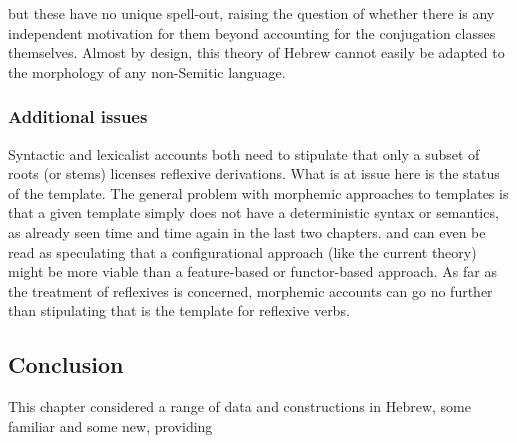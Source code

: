 \begin{exe}
\begin{xlist}
\begin{xlist}
\begin{exe}
\begin{xlist}
\begin{xlist}
\begin{exe}
\begin{xlist}
\begin{xlist}
\begin{exe}
\begin{exe}
\begin{xlist}
\begin{exe}
\begin{exe}
\begin{xlist}
\begin{exe}
\begin{exe}
\begin{exe}
\begin{exe}
\begin{exe}
\begin{xlist}
\begin{exe}
\begin{xlist}
\begin{exe}
\begin{exe}
\begin{xlist}
\begin{exe}
\begin{xlist}
\begin{exe}
\begin{xlist}
\begin{exe}
\begin{exe}
\begin{exe}
\begin{xlist}
\begin{exe}
\begin{exe}
\begin{exe}
\begin{xlist}
\begin{exe}
\begin{xlist}
\begin{exe}
\begin{xlist}
\begin{exe}
\begin{xlist}
\begin{exe}
\begin{exe}
\begin{exe}
\begin{exe}
\begin{xlist}
\begin{exe}
\begin{xlist}
\begin{exe}
\begin{xlist}
\begin{exe}
\begin{xlist}
\begin{exe}
\begin{xlist}
\begin{exe}
\begin{xlist}
\begin{exe}
\begin{exe}
\begin{exe}
\begin{exe}
\begin{xlist}
\begin{exe}
\begin{xlist}
\begin{exe}
\begin{xlist}
\begin{exe}
\begin{exe}
\begin{xlist}
\begin{exe}
\begin{xlist}
\begin{exe}
\begin{exe}
\begin{exe}
\begin{exe}
\begin{xlist}
\begin{xlist}
\begin{exe}
\begin{xlist}
\begin{exe}
\begin{exe}
\begin{exe}
\begin{xlist}
\begin{exe}
\begin{exe}
\begin{xlist}
\begin{exe}
\begin{exe}
\begin{exe}
\begin{xlist}
\begin{xlist}
\begin{exe}
\begin{xlist}
\begin{exe}
\begin{exe}
\begin{exe}
\begin{exe}
\begin{xlist}
\begin{exe}
\begin{xlist}
\begin{exe}
\begin{xlist}
\begin{exe}
\begin{xlist}
\begin{exe}
\begin{exe}
\begin{exe}
\begin{exe}
\begin{exe}
\begin{exe}
\begin{xlist}
\begin{exe}
\begin{xlist}
\begin{exe}
\begin{xlist}
\begin{exe}
\begin{xlist}
\begin{exe}
\begin{xlist}
\begin{exe}
\begin{xlist}
\begin{exe}
\begin{xlist}
\begin{exe}
\begin{xlist}
\begin{exe}
\begin{xlist}
but these have no unique spell-out, raising the question of whether there is any independent motivation for them beyond accounting for the conjugation classes themselves. Almost by design, this theory of Hebrew cannot easily be adapted to the morphology of any non-Semitic language.

		\subsubsection{Additional issues}
Syntactic and lexicalist accounts both need to stipulate that only a subset of roots (or stems) licenses reflexive derivations. What is at issue here is the status of the template. The general problem with morphemic approaches to templates is that a given template simply does not have a deterministic syntax or semantics, as already seen time and time again in the last two chapters. \citet[197]{arad05} and \citet[564]{borer13oup} can even be read as speculating that a configurational approach (like the current theory) might be more viable than a feature-based or functor-based approach. As far as the treatment of reflexives is concerned, morphemic accounts can go no further than stipulating that {\thit} is the template for reflexive verbs.

	\subsection{Conclusion} \label{vz:others:conc}
This chapter considered a range of data and constructions in Hebrew, some familiar and some new, providing 
\end{xlist}
\end{exe}
\end{xlist}
\end{exe}
\end{xlist}
\end{exe}
\end{xlist}
\end{exe}
\end{xlist}
\end{exe}
\end{xlist}
\end{exe}
\end{xlist}
\end{exe}
\end{xlist}
\end{exe}
\end{xlist}
\end{exe}
\end{exe}
\end{exe}
\end{exe}
\end{exe}
\end{exe}
\end{xlist}
\end{exe}
\end{xlist}
\end{exe}
\end{xlist}
\end{exe}
\end{xlist}
\end{exe}
\end{exe}
\end{exe}
\end{exe}
\end{xlist}
\end{exe}
\end{xlist}
\end{xlist}
\end{exe}
\end{exe}
\end{exe}
\end{xlist}
\end{exe}
\end{exe}
\end{xlist}
\end{exe}
\end{exe}
\end{exe}
\end{xlist}
\end{exe}
\end{xlist}
\end{xlist}
\end{exe}
\end{exe}
\end{exe}
\end{exe}
\end{xlist}
\end{exe}
\end{xlist}
\end{exe}
\end{exe}
\end{xlist}
\end{exe}
\end{xlist}
\end{exe}
\end{xlist}
\end{exe}
\end{exe}
\end{exe}
\end{exe}
\end{xlist}
\end{exe}
\end{xlist}
\end{exe}
\end{xlist}
\end{exe}
\end{xlist}
\end{exe}
\end{xlist}
\end{exe}
\end{xlist}
\end{exe}
\end{exe}
\end{exe}
\end{exe}
\end{xlist}
\end{exe}
\end{xlist}
\end{exe}
\end{xlist}
\end{exe}
\end{xlist}
\end{exe}
\end{exe}
\end{exe}
\end{xlist}
\end{exe}
\end{exe}
\end{exe}
\end{xlist}
\end{exe}
\end{xlist}
\end{exe}
\end{xlist}
\end{exe}
\end{exe}
\end{xlist}
\end{exe}
\end{xlist}
\end{exe}
\end{exe}
\end{exe}
\end{exe}
\end{exe}
\end{xlist}
\end{exe}
\end{exe}
\end{xlist}
\end{exe}
\end{exe}
\end{xlist}
\end{xlist}
\end{exe}
\end{xlist}
\end{xlist}
\end{exe}
\end{xlist}
\end{xlist}
\end{exe}
